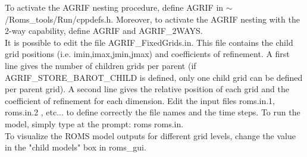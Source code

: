 To activate the AGRIF nesting procedure, define AGRIF in
$\sim$/Roms\_tools/Run/cppdefs.h. Moreover, to activate the AGRIF nesting with the
$2$-way capability, define AGRIF and AGRIF\_$2$WAYS. \\




It is possible to edit the file AGRIF\_FixedGrids.in.  This file contains the child
grid positions (i.e. imin,imax,jmin,jmax) and coefficients of refinement. A first
line gives the number of children grids per parent (if AGRIF\_STORE\_BAROT\_CHILD is
defined, only one child grid can be defined per parent grid). A second line gives the
relative position of each grid and the coefficient of refinement for each dimension.
Edit the input files roms.in.1, roms.in.2 , etc... to define correctly the file names
and the time steps. To run the model, simply type at the prompt: roms roms.in. \\

To visualize the ROMS model outputs for different grid levels, 
change the value in the "child models" box
in roms\_gui.


